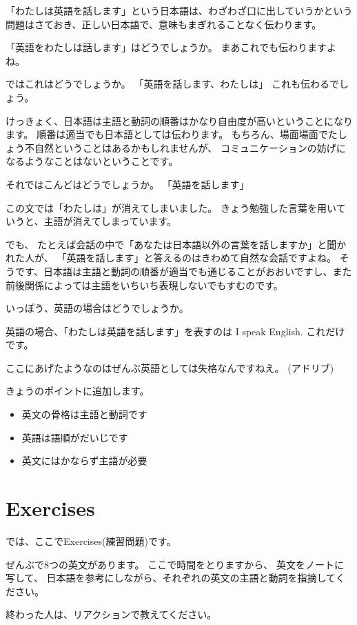 \documentclass[book,jafontscale=0.9247]{jlreq}
\begin{document}
「わたしは英語を話します」という日本語は、わざわざ口に出していうかという問題はさておき、正しい日本語で、意味もまぎれることなく伝わります。

「英語をわたしは話します」はどうでしょうか。
まあこれでも伝わりますよね。

ではこれはどうでしょうか。
「英語を話します、わたしは」
これも伝わるでしょう。

けっきょく、日本語は主語と動詞の順番はかなり自由度が高いということになります。
順番は適当でも日本語としては伝わります。
もちろん、場面場面でたしょう不自然ということはあるかもしれませんが、
コミュニケーションの妨げになるようなことはないということです。


それではこんどはどうでしょうか。
「英語を話します」

この文では「わたしは」が消えてしまいました。
きょう勉強した言葉を用いていうと、主語が消えてしまっています。

でも、
たとえば会話の中で「あなたは日本語以外の言葉を話しますか」と聞かれた人が、
「英語を話します」と答えるのはきわめて自然な会話ですよね。
そうです、日本語は主語と動詞の順番が適当でも通じることがおおいですし、また前後関係によっては主語をいちいち表現しないでもすむのです。

いっぽう、英語の場合はどうでしょうか。

英語の場合、「わたしは英語を話します」を表すのは
I speak English.
これだけです。

ここにあげたようなのはぜんぶ英語としては失格なんですねえ。
(アドリブ)

きょうのポイントに追加します。
\begin{itemize}
 \item   英文の骨格は主語と動詞です
 \item   英語は語順がだいじです
 \item   英文にはかならず主語が必要
\end{itemize}

\section{Exercises}

では、ここでExercises(練習問題)です。

ぜんぶで8つの英文があります。
ここで時間をとりますから、
英文をノートに写して、
日本語を参考にしながら、それぞれの英文の主語と動詞を指摘してください。

終わった人は、リアクションで教えてください。
\end{document}
